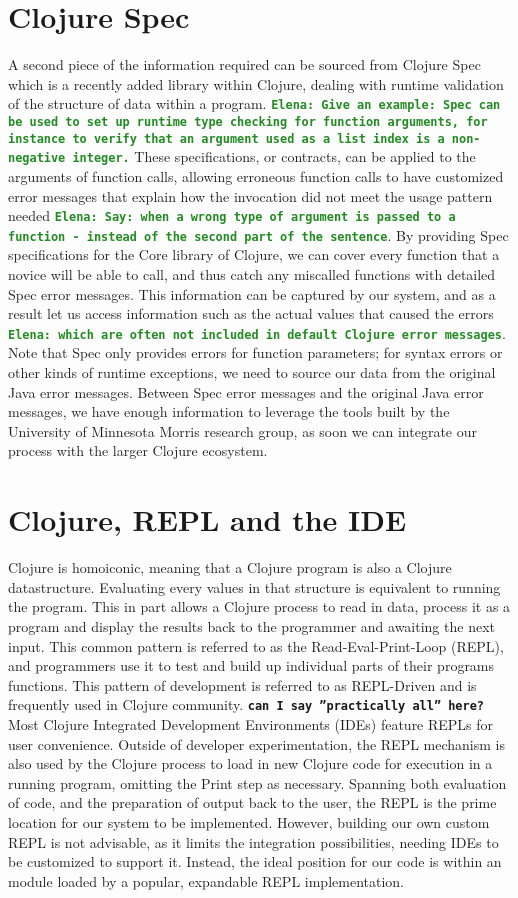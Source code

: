 \documentclass[12pt]{article}
\newcommand{\comment}[1]{{\bf \tt  {#1}}}
\newcommand{\emcomment}[1]{\textcolor{ForestGreen}{\comment{Elena: {#1}}}}
\begin{document}
\section{Clojure Spec}
A second piece of the information required can be sourced from Clojure Spec~\cite{spec}
which is a recently added library within Clojure, dealing with runtime validation of
the structure of data within a program. 
\emcomment{Give an example: Spec can be used to set up runtime
type checking for function arguments, for instance to verify that an argument used 
as a list index is a non-negative integer.}
These specifications, or contracts, can be applied to
 the arguments of function calls, allowing erroneous function calls to have
customized error messages that explain how the invocation did not meet the usage pattern
 needed \emcomment{Say: when a wrong type of argument is passed to a function - instead of the second part of the sentence}. 
By providing Spec specifications for the Core library of Clojure,
 we can cover every function that a novice will be able to call, and thus catch
 any miscalled functions with detailed Spec error messages.
 This information can be captured by our system, and as a result
 let us access information such as the actual values that caused the errors 
\emcomment{which are often not included in default Clojure error messages}.
Note that Spec only provides errors for function parameters; for syntax errors or other kinds of 
runtime exceptions, we need to source our data from the original Java error messages.
Between Spec error messages and the original Java error messages, we have enough
information to leverage the tools built by the
 University of Minnesota Morris research group, as soon we can integrate
 our process with the larger Clojure ecosystem.

\section{Clojure, REPL and the IDE}
Clojure is homoiconic, meaning that a Clojure program is also a Clojure datastructure.
 Evaluating every values in that structure is
equivalent to running the program.
This in part allows a Clojure process to read in data, process it as a program
and display the results back to the programmer and awaiting the next input.
 This common pattern is referred to
as the Read-Eval-Print-Loop (REPL), and programmers use it to test and build up
individual parts of their programs functions. This pattern of development is
referred to as REPL-Driven and is frequently used in Clojure community.
\comment{can I say ''practically all'' here?}
 Most Clojure Integrated Development Environments (IDEs) feature REPLs for
 user convenience. Outside of developer experimentation, the REPL mechanism is also used
by the Clojure process to load in new Clojure code for execution in a running program,
omitting the Print step as necessary.
Spanning both evaluation of code, and the preparation of output back to the user,
the REPL is the prime location for our system to be implemented.
However, building our own custom REPL is not advisable, as it limits the
integration possibilities, needing IDEs to be customized to support it.
Instead, the ideal position for our code is within an module loaded
by a popular, expandable REPL implementation.
\end{document}

